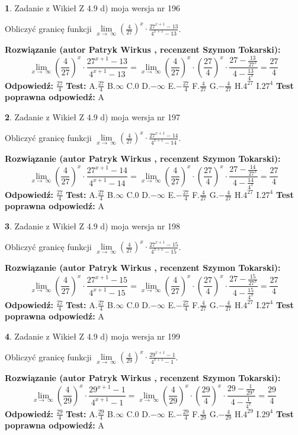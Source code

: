\documentclass[12pt, a4paper]{article}
\theoremstyle{definition} %
\newtheorem{zad}{}
\newcommand{\zadStart}[1]{\begin{zad}#1\newline}
\newcommand{\zadStop}{\end{zad}}
\newcommand{\rozwStart}[2]{\noindent \textbf{Rozwiązanie (autor #1 , recenzent #2): }\newline}
\newcommand{\rozwStop}{\newline}
\newcommand{\odpStart}{\noindent \textbf{Odpowiedź:}\newline}
\newcommand{\odpStop}{\newline}
\newcommand{\testStart}{\noindent \textbf{Test:}\newline}
\newcommand{\testStop}{\newline}
\newcommand{\kluczStart}{\noindent \textbf{Test poprawna odpowiedź:}\newline}
\newcommand{\kluczStop}{\newline}
\begin{document}
\zadStart{Zadanie z Wikieł Z 4.9 d) moja wersja nr 196}


Obliczyć granicę funkcji  $\lim\limits_{x\to\ \infty}(\frac{4}{27})^{x}\cdot\frac{27^{x+1}-13}{4^{x+1}-13}$.
\zadStop
\rozwStart{Patryk Wirkus}{Szymon Tokarski}
$$\lim\limits_{x\to\ \infty}(\frac{4}{27})^{x}\cdot\frac{27^{x+1}-13}{4^{x+1}-13}=\lim\limits_{x\to\ \infty}(\frac{4}{27})^{x}\cdot(\frac{27}{4})^{x} \cdot \frac{27-\frac{13}{27^{x}}}{4-\frac{13}{4^{x}}} = \frac{27}{4}$$
\rozwStop
\odpStart
$\frac{27}{4}$
\odpStop
\testStart
A.$\frac{27}{4}$ B.$\infty$ C.$0$ D.$-\infty$ E.$-\frac{27}{4}$
F.$\frac{4}{27}$ G.$-\frac{4}{27}$
H.$4^{27}$
I.$27^{4}$
\testStop
\kluczStart
A
\kluczStop



\zadStart{Zadanie z Wikieł Z 4.9 d) moja wersja nr 197}


Obliczyć granicę funkcji  $\lim\limits_{x\to\ \infty}(\frac{4}{27})^{x}\cdot\frac{27^{x+1}-14}{4^{x+1}-14}$.
\zadStop
\rozwStart{Patryk Wirkus}{Szymon Tokarski}
$$\lim\limits_{x\to\ \infty}(\frac{4}{27})^{x}\cdot\frac{27^{x+1}-14}{4^{x+1}-14}=\lim\limits_{x\to\ \infty}(\frac{4}{27})^{x}\cdot(\frac{27}{4})^{x} \cdot \frac{27-\frac{14}{27^{x}}}{4-\frac{14}{4^{x}}} = \frac{27}{4}$$
\rozwStop
\odpStart
$\frac{27}{4}$
\odpStop
\testStart
A.$\frac{27}{4}$ B.$\infty$ C.$0$ D.$-\infty$ E.$-\frac{27}{4}$
F.$\frac{4}{27}$ G.$-\frac{4}{27}$
H.$4^{27}$
I.$27^{4}$
\testStop
\kluczStart
A
\kluczStop



\zadStart{Zadanie z Wikieł Z 4.9 d) moja wersja nr 198}


Obliczyć granicę funkcji  $\lim\limits_{x\to\ \infty}(\frac{4}{27})^{x}\cdot\frac{27^{x+1}-15}{4^{x+1}-15}$.
\zadStop
\rozwStart{Patryk Wirkus}{Szymon Tokarski}
$$\lim\limits_{x\to\ \infty}(\frac{4}{27})^{x}\cdot\frac{27^{x+1}-15}{4^{x+1}-15}=\lim\limits_{x\to\ \infty}(\frac{4}{27})^{x}\cdot(\frac{27}{4})^{x} \cdot \frac{27-\frac{15}{27^{x}}}{4-\frac{15}{4^{x}}} = \frac{27}{4}$$
\rozwStop
\odpStart
$\frac{27}{4}$
\odpStop
\testStart
A.$\frac{27}{4}$ B.$\infty$ C.$0$ D.$-\infty$ E.$-\frac{27}{4}$
F.$\frac{4}{27}$ G.$-\frac{4}{27}$
H.$4^{27}$
I.$27^{4}$
\testStop
\kluczStart
A
\kluczStop



\zadStart{Zadanie z Wikieł Z 4.9 d) moja wersja nr 199}


Obliczyć granicę funkcji  $\lim\limits_{x\to\ \infty}(\frac{4}{29})^{x}\cdot\frac{29^{x+1}-1}{4^{x+1}-1}$.
\zadStop
\rozwStart{Patryk Wirkus}{Szymon Tokarski}
$$\lim\limits_{x\to\ \infty}(\frac{4}{29})^{x}\cdot\frac{29^{x+1}-1}{4^{x+1}-1}=\lim\limits_{x\to\ \infty}(\frac{4}{29})^{x}\cdot(\frac{29}{4})^{x} \cdot \frac{29-\frac{1}{29^{x}}}{4-\frac{1}{4^{x}}} = \frac{29}{4}$$
\rozwStop
\odpStart
$\frac{29}{4}$
\odpStop
\testStart
A.$\frac{29}{4}$ B.$\infty$ C.$0$ D.$-\infty$ E.$-\frac{29}{4}$
F.$\frac{4}{29}$ G.$-\frac{4}{29}$
H.$4^{29}$
I.$29^{4}$
\testStop
\kluczStart
A
\kluczStop
\end{document}

